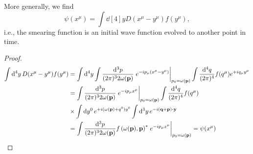 \begin{lemma}
	More generally, we find
	\begin{equation}
		\psi(x^\mu)
		=
		\int\dd[4]{y}
		D(x^\mu-y^\mu)
		f(y^\mu)
		,
	\end{equation}
	i.e., the smearing function is an initial wave function evolved to another point in time.
\end{lemma}
\begin{proof}
	\begin{equation*}
		\begin{split}
			\int\dd[4]{y}
			D(x^\mu-y^\mu)
			f(y^\mu)
			&=
			\int\dd[4]{y}
			\int\frac{\dd[3]{p}}{(2\pi)^32\omega(\vb{p})}
			\eval{e^{-ip_\mu(x^\mu-y^\mu)}}_{p_0=\omega(\vb{p})}
			\int\frac{\dd[4]{q}}{(2\pi)^4}
			f(q^\mu)
			e^{+iq_\mu y^\mu}
			\\
			&=
			\int\frac{\dd[3]{p}}{(2\pi)^32\omega(\vb{p})}
			\eval{e^{-ip_\mu x^\mu}}_{p_0=\omega(\vb{p})}
			\int\frac{\dd[4]{q}}{(2\pi)^4}
			f(q^\mu)
			\\
			&\times
			\int\dd{y^0}
			e^{+i(\omega(\vb{p})+q^0)y^0}
			\int\dd[3]{y}
			e^{-i(\vb{q}+\vb{p})\vdot\vb{y}}
			\\
			&=
			\int\frac{\dd[3]{p}}{(2\pi)^32\omega(\vb{p})}
			f\left(\omega(\vb{p}),\vb{p}\right)^*
			\eval{e^{-ip_\mu x^\mu}}_{p_0=\omega(\vb{p})}
			=
			\psi(x^\mu)
		\end{split}
	\end{equation*}
\end{proof}